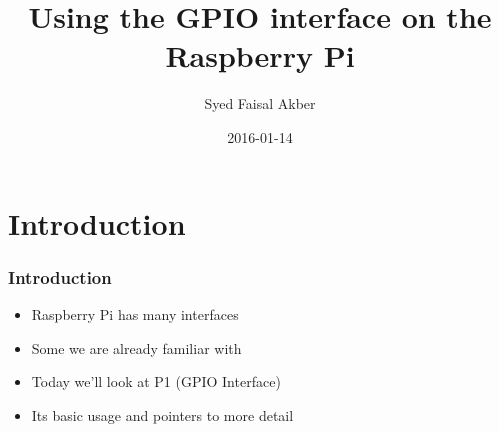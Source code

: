 \documentclass[slidestop,usepdftitle=false,14pt,table]{beamer}
\title[Raspberry Pi GPIO]
      {Using the GPIO interface on the Raspberry Pi}
\author[S. F. Akber]{Syed Faisal Akber}
\date{2016-01-14}
\begin{document}
{
  \begin{frame}
    \maketitle
  \end{frame}
}

{
\begin{frame}
  \tableofcontents
\end{frame}
}




\section{Introduction}
\begin{frame}
\frametitle{Introduction}
\begin{itemize}
\item Raspberry Pi has many interfaces
\item Some we are already familiar with
\item Today we'll look at P1 (GPIO Interface)
\item Its basic usage and pointers to more detail
\end{itemize}
\end{frame}
\end{document}

